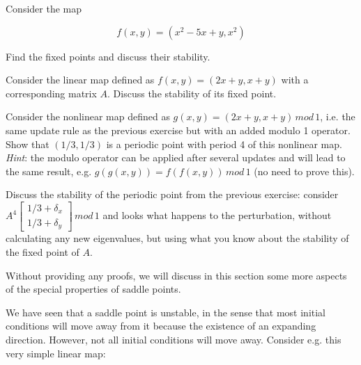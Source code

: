 \begin{exer}
Consider the map 

$$f(x,y) = (x^2-5x+y, x^2)$$

Find the fixed points and discuss their stability.
\end{exer}


\begin{exer}
Consider the linear map defined as $f(x,y) = (2x+y, x+y)$ with a corresponding matrix $A$. Discuss the stability of its fixed point.
\end{exer}

\begin{exer}
Consider the nonlinear map defined as $g(x,y) = (2x+y, x+y)\, mod \, 1$, i.e. the same update rule as the previous exercise but with an added modulo 1 operator. Show that $(1/3, 1/3)$ is a periodic point with period 4 of this nonlinear map.\\

\textit{Hint}: the modulo operator can be applied after several updates and will lead to the same result, e.g.  $g(g(x,y)) = f(f(x,y)) \, mod \, 1$ (no need to prove this).
\end{exer}

\begin{exer}
Discuss the stability of the periodic point from the previous exercise: consider $A^4 \begin{bmatrix} 1/3 + \delta_x \\ 1/3 + \delta_y \end{bmatrix} \, mod \, 1$ and looks what happens to the perturbation, without calculating any new eigenvalues, but using what you know about the stability of the fixed point of $A$.
\end{exer}


\pagebreak


Without providing any proofs, we will discuss in this section some more aspects of the special properties of saddle points.

We have seen that a saddle point is unstable, in the sense that most initial conditions will move away from it because the existence of an expanding direction. However, not all initial conditions will move away. Consider e.g. this very simple linear map:

